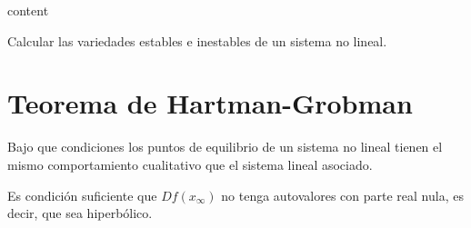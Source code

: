 \begin{theo}
  content
\end{theo}

\begin{ejm}
  Calcular las variedades estables e inestables de un sistema no lineal.
\end{ejm}

\section{Teorema de Hartman-Grobman}

\begin{obs}
  Bajo que condiciones los puntos de equilibrio de un sistema no lineal tienen el mismo comportamiento cualitativo que el sistema lineal asociado.
\end{obs}

\begin{theo}
  Es condición suficiente que $Df(x_{\infty})$ no tenga autovalores con parte real nula, es decir, que sea hiperbólico.
\end{theo}
